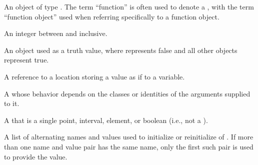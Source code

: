 \begin{glossary-list}
%
%
An object of type .  The term ``function'' is often
used to denote a , with the term ``function
object'' used when referring specifically to a function object.


\glent[fixnum]
%
%
%
An integer between  and
 inclusive.


%
%
%
%
An object used as a truth value, where \nil{} represents false and all other
objects represent true.


%
%
%
A reference to a location storing a value as if to a variable.


%
%
A  whose behavior depends on the classes or identities of the
arguments supplied to it.


%
%
%
A  that is a single point, interval, element, or
boolean (i.e., not a ).


%
%
%
%
A list of alternating names and values used to initialize or reinitialize
 of .  If more than one name and value pair
has the same name, only the first such pair is used to provide the value.



\end{glossary-list}

